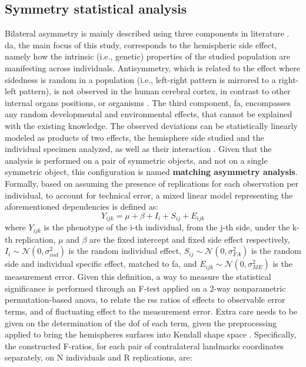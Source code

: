 \subsection{Symmetry statistical analysis}
\label{subsec:stat_methods}
Bilateral asymmetry is mainly described using three components in literature \cite{klingenberg2002}\cite{Vingerhoets2021}. \Acf{da}, the main focus of this study, corresponds to the hemispheric side effect, namely how the intrinsic (i.e., genetic) properties of the studied population are manifesting across individuals. Antisymmetry, which is related to the effect where sidedness is random in a population (i.e., left-right pattern is mirrored to a right-left pattern), is not observed in the human cerebral cortex, in contrast to other internal organs positions, or organisms \cite{Neubauer2020}. The third component, \acf{fa}, encompasses any random developmental and environmental effects, that cannot be explained with the existing knowledge. The observed deviations can be statistically linearly modeled as products of two effects, the hemisphere side studied and the individual specimen analyzed, as well as their interaction \cite{klingenberg2002}. Given that the analysis is performed on a pair of symmetric objects, and not on a single symmetric object, this configuration is named \textbf{matching asymmetry analysis}. Formally, based on \cite{VanDongen1999} assuming the presence of replications for each observation per individual, to account for technical error, a mixed linear model representing the aforementioned dependencies is defined as:
\begin{equation}
Y_{ijk} = \mu + \beta + I_i + S_{ij} + E_{ijk}
\end{equation}
where $Y_{ijk}$ is the phenotype of the i-th individual, from the j-th side, under the k-th replication, $\mu$ and $\beta$ are the fixed intercept and fixed side effect respectively, $I_i\sim\mathcal{N}(0,\sigma^2_{ind})$ is the random individual effect,  $S_{ij}\sim\mathcal{N}(0,\sigma^2_{FA})$ is the random side and individual specific effect, matched to \ac{fa}, and $E_{ijk}\sim\mathcal{N}(0,\sigma^2_{ME})$ is the measurement error. Given this definition, a way to measure the statistical significance is performed through an F-test applied on a 2-way nonparametric permutation-based \ac{anova}, to relate the \ac{rss} ratios of effects to observable error terms, and of fluctuating effect to the measurement error. Extra care needs to be given on the determination of the \ac{dof} of each term, given the preprocessing applied to bring the hemispheres surfaces into Kendall shape space \cite{klingenberg2002}.  Specifically, the constructed F-ratios, for each pair of contralateral landmarks coordinates separately, on N individuals and R replications, are:
